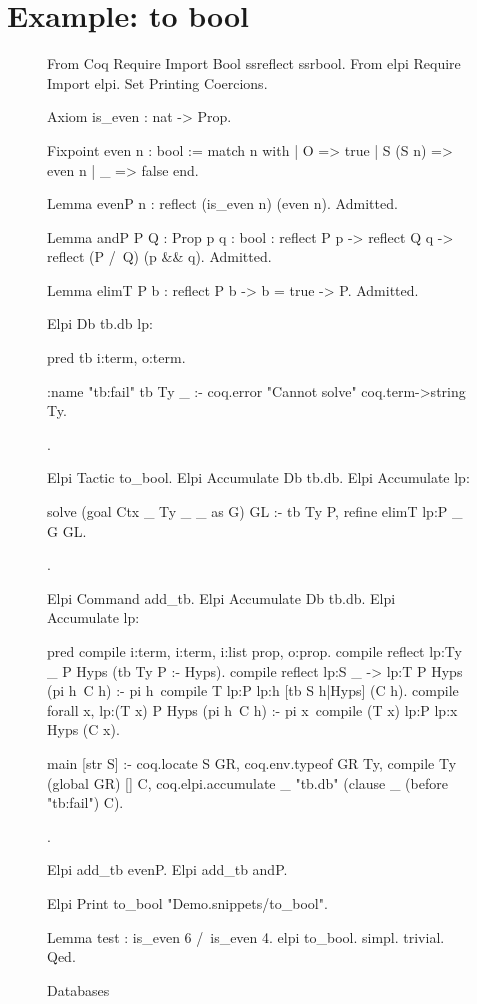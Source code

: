 \documentclass[a4paper, 11pt]{book}
\begin{document}
\section{Example: to bool}

\begin{figure}
  \begin{coqcode}
    From Coq Require Import Bool ssreflect ssrbool.
From elpi Require Import elpi.
Set Printing Coercions.

Axiom is_even : nat -> Prop.

Fixpoint even n : bool :=
  match n with
  | O => true
  | S (S n) => even n
  | _ => false
  end.

Lemma evenP n : reflect (is_even n) (even n).
Admitted.

Lemma andP  {P Q : Prop} {p q : bool} :
  reflect P p -> reflect Q q ->
    reflect (P /\ Q) (p && q).
Admitted.

Lemma elimT {P b} :
  reflect P b -> b = true ->
    P.
Admitted.

Elpi Db tb.db lp:{{
pred tb i:term, o:term.

:name "tb:fail"
tb Ty _ :- coq.error "Cannot solve" {coq.term->string Ty}.

}}.

Elpi Tactic to_bool.
Elpi Accumulate Db tb.db.
Elpi Accumulate lp:{{

solve (goal Ctx _ Ty _ _ as G) GL :-
  tb Ty P,
  refine {{ elimT lp:P _ }} G GL.

}}.

Elpi Command add_tb.
Elpi Accumulate Db tb.db.
Elpi Accumulate lp:{{

%
%

%
%

pred compile i:term, i:term, i:list prop, o:prop.
compile {{ reflect lp:Ty _ }} P Hyps (tb Ty P :- Hyps).
compile {{ reflect lp:S _ -> lp:T }} P Hyps (pi h\ C h) :-
  pi h\
    compile T {{ lp:P lp:h }} [tb S h|Hyps] (C h).
compile {{ forall x, lp:(T x) }} P Hyps (pi h\ C h) :-
  pi x\
    compile (T x) {{ lp:P lp:x }} Hyps (C x).
    
main [str S] :-
  coq.locate S GR,
  coq.env.typeof GR Ty,
  compile Ty (global GR) [] C,
  coq.elpi.accumulate _ "tb.db" (clause _ (before "tb:fail") C).

}}.

Elpi add_tb evenP.
Elpi add_tb andP.

Elpi Print to_bool "Demo.snippets/to_bool".


Lemma test : is_even 6 /\ is_even 4.
elpi to_bool.
simpl.
trivial.
Qed.

  \end{coqcode}
  \caption[Databases]{Databases\label{databases}}
  \end{figure}
\end{document}

